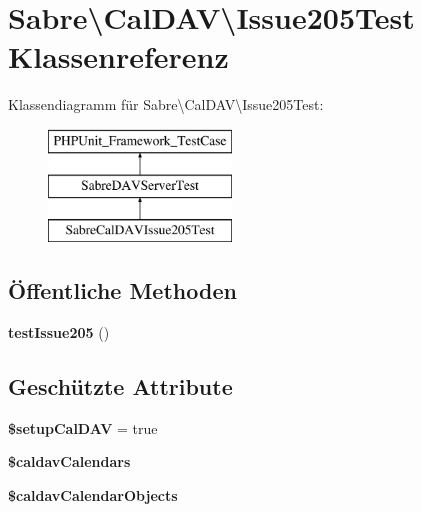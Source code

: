 \hypertarget{class_sabre_1_1_cal_d_a_v_1_1_issue205_test}{}\section{Sabre\textbackslash{}Cal\+D\+AV\textbackslash{}Issue205\+Test Klassenreferenz}
\label{class_sabre_1_1_cal_d_a_v_1_1_issue205_test}
Klassendiagramm für Sabre\textbackslash{}Cal\+D\+AV\textbackslash{}Issue205\+Test\+:\begin{figure}[H]
\begin{center}
\leavevmode
\includegraphics[height=3.000000cm]{class_sabre_1_1_cal_d_a_v_1_1_issue205_test}
\end{center}
\end{figure}
\subsection*{Öffentliche Methoden}
\begin{DoxyCompactItemize}
\item 
\mbox{\label{class_sabre_1_1_cal_d_a_v_1_1_issue205_test_acd40efcb29e268319edf5cdbc4bc8e10}} 
{\bfseries test\+Issue205} ()
\end{DoxyCompactItemize}
\subsection*{Geschützte Attribute}
\begin{DoxyCompactItemize}
\item 
\mbox{\label{class_sabre_1_1_cal_d_a_v_1_1_issue205_test_aad514bd2f7ae5a144ec2096d7b7b087e}} 
{\bfseries \$setup\+Cal\+D\+AV} = true
\item 
{\bfseries \$caldav\+Calendars}
\item 
{\bfseries \$caldav\+Calendar\+Objects}
\end{DoxyCompactItemize}


